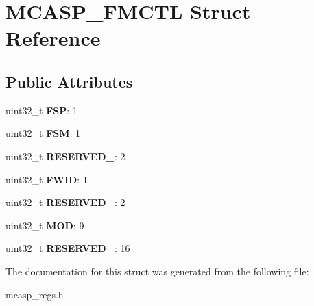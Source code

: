 \hypertarget{structMCASP__FMCTL}{\section{M\-C\-A\-S\-P\-\_\-\-F\-M\-C\-T\-L Struct Reference}
\label{structMCASP__FMCTL}
}
\subsection*{Public Attributes}
\begin{DoxyCompactItemize}
\item 
\hypertarget{structMCASP__FMCTL_ad3cc3e208666e309dffa7a5816a84d16}{uint32\-\_\-t {\bfseries F\-S\-P}\-: 1}\label{structMCASP__FMCTL_ad3cc3e208666e309dffa7a5816a84d16}

\item 
\hypertarget{structMCASP__FMCTL_a53664318fd3eac830ce0d40e5c0e6ce4}{uint32\-\_\-t {\bfseries F\-S\-M}\-: 1}\label{structMCASP__FMCTL_a53664318fd3eac830ce0d40e5c0e6ce4}

\item 
\hypertarget{structMCASP__FMCTL_ac389541c62d7b3c872056d0226aa46bd}{uint32\-\_\-t {\bfseries R\-E\-S\-E\-R\-V\-E\-D\-\_}\-: 2}\label{structMCASP__FMCTL_ac389541c62d7b3c872056d0226aa46bd}

\item 
\hypertarget{structMCASP__FMCTL_a7aa8970a936321ffa4c25a76be08776d}{uint32\-\_\-t {\bfseries F\-W\-I\-D}\-: 1}\label{structMCASP__FMCTL_a7aa8970a936321ffa4c25a76be08776d}

\item 
\hypertarget{structMCASP__FMCTL_a6fe51c580e3e095e391e336465057d4a}{uint32\-\_\-t {\bfseries R\-E\-S\-E\-R\-V\-E\-D\-\_}\-: 2}\label{structMCASP__FMCTL_a6fe51c580e3e095e391e336465057d4a}

\item 
\hypertarget{structMCASP__FMCTL_a1e6c110dad11b00932b7066b5d7542d3}{uint32\-\_\-t {\bfseries M\-O\-D}\-: 9}\label{structMCASP__FMCTL_a1e6c110dad11b00932b7066b5d7542d3}

\item 
\hypertarget{structMCASP__FMCTL_a779e7f456fa88465c0cf7bb6b6634026}{uint32\-\_\-t {\bfseries R\-E\-S\-E\-R\-V\-E\-D\-\_}\-: 16}\label{structMCASP__FMCTL_a779e7f456fa88465c0cf7bb6b6634026}

\end{DoxyCompactItemize}


The documentation for this struct was generated from the following file\-:\begin{DoxyCompactItemize}
\item 
mcasp\-\_\-regs.\-h\end{DoxyCompactItemize}
